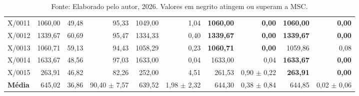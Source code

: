\begin{table}[htbp]
{\begin{tabular}{l r r r r r r r r r}
      X/0011 & 1060,00 & 49,48 & 95,33 & 1049,00 & 1,04 & \textbf{1060,00} & \textbf{0,00} & \textbf{1060,00} & \textbf{0,00} \\
      X/0012 & 1339,67 & 60,69 & 95,47 & 1334,33 & 0,40 & \textbf{1339,67} & \textbf{0,00} & \textbf{1339,67} & \textbf{0,00} \\
      X/0013 & 1060,71 & 59,13 & 94,43 & 1058,29 & 0,23 & \textbf{1060,71} & \textbf{0,00} & 1059,86 & 0,08 \\
      X/0014 & 1633,67 & 48,56 & 97,03 & 1633,00 & 0,04 & 1633,00 & 0,04 & \textbf{1633,67} & \textbf{0,00} \\
      X/0015 & 263,91 & 46,82 & 82,26 & 252,00 & 4,51 & 261,53 & 0,90 $\pm$ 0,22 & \textbf{263,91} & \textbf{0,00} \\
      \midrule
      \textbf{Média} & 645,02 & 36,86 & 90,40 $\pm$ 7,57 & 639,52 & 1,98 $\pm$ 2,32 & 644,30 & 0,38 $\pm$ 0,84 & 644,85 & 0,02 $\pm$ 0,06 \\
      \bottomrule
    \end{tabular}
  }
  \caption*{\footnotesize Fonte: Elaborado pelo autor, 2026. Valores em negrito atingem ou superam a MSC.}
\end{table}
